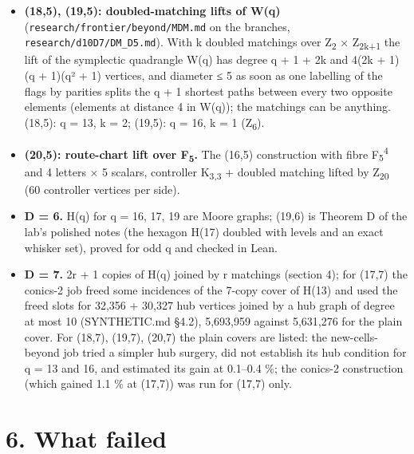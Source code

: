 \documentclass[
  10pt,
]{article}
\providecommand{\tightlist}{%
  \setlength{\itemsep}{0pt}\setlength{\parskip}{0pt}}
\begin{document}
\begin{itemize}
\tightlist
\item
  \textbf{(18,5), (19,5): doubled-matching lifts of W(q)} (\texttt{research/\allowbreak{}frontier/\allowbreak{}beyond/\allowbreak{}MDM.md} on the branches,
  \texttt{research/\allowbreak{}d10D7/\allowbreak{}DM\_\allowbreak{}D5.md}). With k doubled matchings over Z\textsubscript{2} × Z\textsubscript{2k+1} the
  lift of the symplectic quadrangle W(q) has degree q + 1 + 2k and 4(2k + 1)(q + 1)(q² + 1) vertices, and diameter ≤ 5
  as soon as one labelling of the flags by parities splits the q + 1 shortest paths between every two opposite
  elements (elements at distance 4 in W(q)); the matchings can be anything. (18,5): q = 13, k = 2; (19,5): q = 16, k =
  1 (Z\textsubscript{6}).
\item
  \textbf{(20,5): route-chart lift over F\textsubscript{5}.} The (16,5) construction with fibre
  F\textsubscript{5}\textsuperscript{4} and 4 letters × 5 scalars, controller K\textsubscript{3,3} + doubled matching
  lifted by Z\textsubscript{20} (60 controller vertices per side).
\item
  \textbf{D = 6.} H(q) for q = 16, 17, 19 are Moore graphs; (19,6) is Theorem D of the lab's polished notes (the
  hexagon H(17) doubled with levels and an exact whisker set), proved for odd q and checked in Lean.
\item
  \textbf{D = 7.} 2r + 1 copies of H(q) joined by r matchings (section 4); for (17,7) the conics-2 job freed some
  incidences of the 7-copy cover of H(13) and used the freed slots for 32,356 + 30,327 hub vertices joined by a hub
  graph of degree at most 10 (SYNTHETIC.md §4.2), 5,693,959 against 5,631,276 for the plain cover. For (18,7), (19,7),
  (20,7) the plain covers are listed: the new-cells-beyond job tried a simpler hub surgery, did not establish its hub
  condition for q = 13 and 16, and estimated its gain at 0.1--0.4 \%; the conics-2 construction (which gained 1.1 \%
  at (17,7)) was run for (17,7) only.
\end{itemize}

\hypertarget{what-failed}{%
\section{6. What failed}\label{what-failed}}
\end{document}
